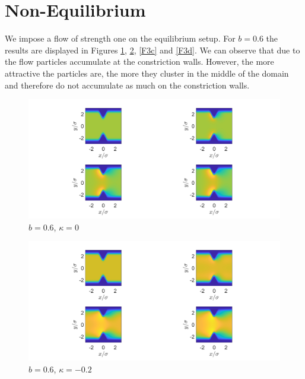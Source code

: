 \documentclass[11pt, a4paper]{article}
\theoremstyle{definition}
\begin{document}
\section{Non-Equilibrium}
We impose a flow of strength one on the equilibrium setup.
For $b = 0.6$ the results are displayed in Figures \ref{F3a}, \ref{F3b}, \ref{F3c} and \ref{F3d}. We can observe that due to the flow particles accumulate at the constriction walls. However, the more attractive the particles are, the more they cluster in the middle of the domain and therefore do not accumulate as much on the constriction walls. 
\begin{figure}[h]
	\centering
	\includegraphics[scale=0.4]{ConFa1.png}
	\caption{$b = 0.6$, $\kappa = 0$} 
	\label{F3a}
\end{figure}

\begin{figure}[h]
	\centering
	\includegraphics[scale=0.4]{ConFa2.png}
	\caption{$b = 0.6$, $\kappa = -0.2$} 
	\label{F3b}
\end{figure}
\end{document}
